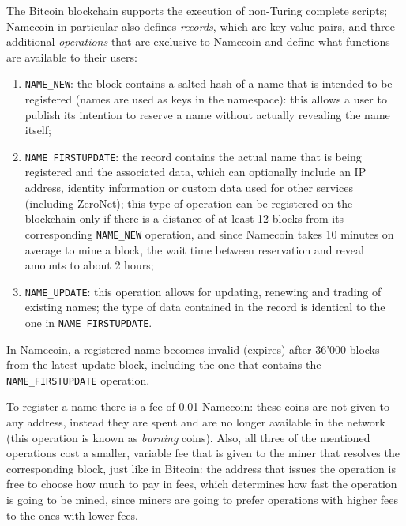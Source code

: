 \documentclass[mscthesis]{usiinfthesis}
\begin{document}
The Bitcoin blockchain supports the execution of non-Turing complete scripts; Namecoin in particular also defines \emph{records}, which are key-value pairs, and three additional \emph{operations} that are exclusive to Namecoin and define what functions are available to their users:
\begin{enumerate}
	\item \texttt{NAME\_NEW}: the block contains a salted hash of a name that is intended to be registered (names are used as keys in the namespace): this allows a user to publish its intention to reserve a name without actually revealing the name itself;
	\item \texttt{NAME\_FIRSTUPDATE}: the record contains the actual name that is being registered and the associated data, which can optionally include an IP address, identity information or custom data used for other services (including ZeroNet); this type of operation can be registered on the blockchain only if there is a distance of at least 12 blocks from its corresponding \texttt{NAME\_NEW} operation, and since Namecoin takes 10 minutes on average to mine a block, the wait time between reservation and reveal amounts to about 2 hours;
	\item \texttt{NAME\_UPDATE}: this operation allows for updating, renewing and trading of existing names; the type of data contained in the record is identical to the one in \texttt{NAME\_FIRSTUPDATE}.
\end{enumerate}

In Namecoin, a registered name becomes invalid (expires) after 36'000 blocks from the latest update block, including the one that contains the \texttt{NAME\_FIRSTUPDATE} operation.

To register a name there is a fee of 0.01 Namecoin: these coins are not given to any address, instead they are spent and are no longer available in the network (this operation is known as \emph{burning} coins). Also, all three of the mentioned operations cost a smaller, variable fee that is given to the miner that resolves the corresponding block, just like in Bitcoin: the address that issues the operation is free to choose how much to pay in fees, which determines how fast the operation is going to be mined, since miners are going to prefer operations with higher fees to the ones with lower fees.
\end{document}
